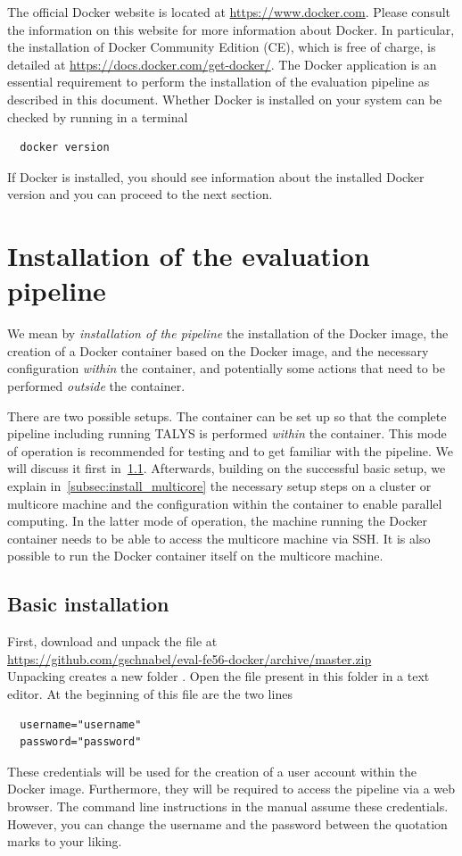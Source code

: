 \documentclass[12pt,a4paper]{scrartcl}
\begin{document}
The official Docker website is located at \url{https://www.docker.com}.
Please consult the information on this website for more information about Docker.
In particular, the installation of Docker Community Edition (CE), which is free of charge, is detailed at \url{https://docs.docker.com/get-docker/}.
The Docker application is an essential requirement to perform the installation of the evaluation pipeline as described in this document.
Whether Docker is installed on your system can be checked by running in a terminal
\begin{verbatim}
  docker version
\end{verbatim}
If Docker is installed, you should see information about the installed Docker version and you can proceed to the next section.

 \section{Installation of the evaluation pipeline}
We mean by \textit{installation of the pipeline} the installation of the Docker image, the creation of a Docker container based on the Docker image, and the necessary configuration \textit{within} the container, and potentially some actions that need to be performed \textit{outside} the container.

There are two possible setups.
The container can be set up so that the complete pipeline including running TALYS is performed \textit{within} the container. This mode of operation is recommended for testing and to get familiar with the pipeline. We will discuss it first in~\cref{subsec:install_basic}.
Afterwards, building on the successful basic setup, we explain in~\cref{subsec:install_multicore} the necessary setup steps on a cluster or multicore machine and the configuration within the container to enable parallel computing.
In the latter mode of operation, the machine running the Docker container needs to be able to access the multicore machine via SSH.
It is also possible to run the Docker container itself on the multicore machine.

 \subsection{Basic installation}
 \label{subsec:install_basic}
  
 First, download and unpack the file at
 \\[2ex]
 \indent\url{https://github.com/gschnabel/eval-fe56-docker/archive/master.zip}
 \\[2ex]
 \noindent 
 Unpacking creates a new folder .
 Open the file  present in this folder in a text editor. At the beginning of this file are the two lines
\begin{verbatim}
  username="username"
  password="password"
\end{verbatim}
 These credentials will be used for the creation of a user account within the Docker image.
 Furthermore, they will be required to access the pipeline via a web browser.
 The command line instructions in the manual assume these credentials. 
However, you can change the username and the password between the quotation marks to your liking.
 
\end{document}

